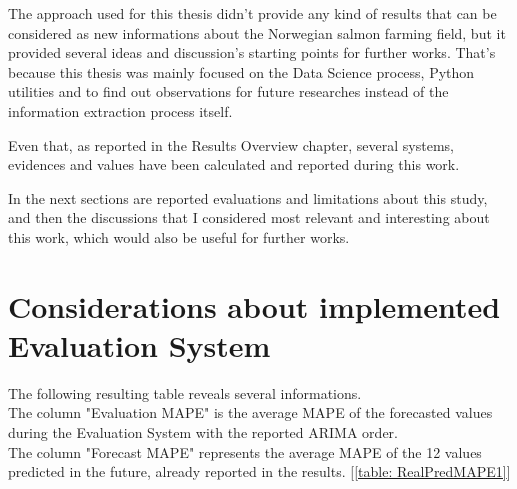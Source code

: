 The approach used for this thesis didn't provide any kind of results that can be considered as new informations about the Norwegian salmon farming field, but it provided several ideas and discussion's starting points for further works. That's because this thesis was mainly focused on the Data Science process, Python utilities and to find out observations for future researches instead of the information extraction process itself.

Even that, as reported in the Results Overview chapter, several systems, evidences and values have been calculated and reported during this work. 

In the next sections are reported evaluations and limitations about this study, and then the discussions that I considered most relevant and interesting about this work, which would also be useful for further works.

\section{Considerations about implemented Evaluation System }
The following resulting table reveals several informations. \\
The column "Evaluation MAPE" is the average MAPE of the forecasted values during the Evaluation System with the reported ARIMA order. \\ 
The column "Forecast MAPE" represents the average MAPE of the 12 values predicted in the future, already reported in the results. [\ref{table: RealPredMAPE1}] 

 \begin{table}[ht]
         \caption{Comparison between Evaluation MAPE and Prediction MAPE}   
   \label{table: MAPE_Comparison} 
\end{table}        

